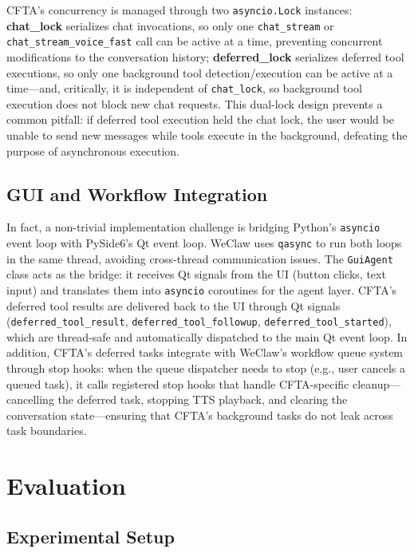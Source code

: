 \documentclass[numbered,mediumone,traditional]{oup-authoring-template}
\begin{document}
CFTA's concurrency is managed through two \texttt{asyncio.Lock} instances: \textbf{chat\_lock} serializes chat invocations, so only one \texttt{chat\_stream} or \texttt{chat\_stream\_voice\_fast} call can be active at a time, preventing concurrent modifications to the conversation history; \textbf{deferred\_lock} serializes deferred tool executions, so only one background tool detection/execution can be active at a time---and, critically, it is independent of \texttt{chat\_lock}, so background tool execution does not block new chat requests. This dual-lock design prevents a common pitfall: if deferred tool execution held the chat lock, the user would be unable to send new messages while tools execute in the background, defeating the purpose of asynchronous execution.

\subsection{GUI and Workflow Integration}

In fact, a non-trivial implementation challenge is bridging Python's \texttt{asyncio} event loop with PySide6's Qt event loop. WeClaw uses \texttt{qasync} to run both loops in the same thread, avoiding cross-thread communication issues. The \texttt{GuiAgent} class acts as the bridge: it receives Qt signals from the UI (button clicks, text input) and translates them into \texttt{asyncio} coroutines for the agent layer. CFTA's deferred tool results are delivered back to the UI through Qt signals (\texttt{deferred\_tool\_result}, \texttt{deferred\_tool\_followup}, \texttt{deferred\_tool\_started}), which are thread-safe and automatically dispatched to the main Qt event loop. In addition, CFTA's deferred tasks integrate with WeClaw's workflow queue system through stop hooks: when the queue dispatcher needs to stop (e.g., user cancels a queued task), it calls registered stop hooks that handle CFTA-specific cleanup---cancelling the deferred task, stopping TTS playback, and clearing the conversation state---ensuring that CFTA's background tasks do not leak across task boundaries.

\section{Evaluation}

\subsection{Experimental Setup}
\end{document}

